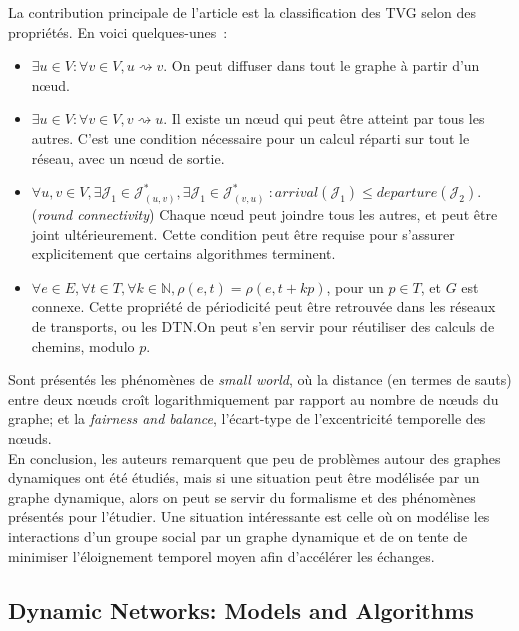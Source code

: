 \documentclass[12pt,a4paper]{article}
\begin{document}
La contribution principale de l'article est la classification des TVG
selon des propriétés. En voici quelques-unes~:

\begin{itemize}
\item \(\exists u \in V : \forall v \in V, u \rightsquigarrow v\). On
  peut diffuser dans tout le graphe à partir d'un nœud.
\item \(\exists u \in V : \forall v \in V, v \rightsquigarrow u\). Il
  existe un nœud qui peut être atteint par tous les autres. C'est une
  condition nécessaire pour un calcul réparti sur tout le réseau, avec
  un nœud de sortie.
\item
  \(\forall u, v \in V, \exists \mathcal{J}_1 \in
  \mathcal{J}^*_{(u,v)}, \exists \mathcal{J}_1 \in
  \mathcal{J}^*_{(v,u)}~: arrival(\mathcal{J}_1) \leq
  departure(\mathcal{J}_2)\). (\textit{round connectivity}) Chaque
  nœud peut joindre tous les autres, et peut être joint
  ultérieurement. Cette condition peut être requise pour s'assurer
  explicitement que certains algorithmes terminent.
\item
  \(\forall e \in E, \forall t \in T, \forall k \in \mathbb{N},
  \rho(e, t) = \rho(e, t + kp)\), pour un \(p \in T\), et \(G\) est
  connexe. Cette propriété de périodicité peut être retrouvée dans les
  réseaux de transports, ou les DTN.\@ On peut s'en servir pour
  réutiliser des calculs de chemins, modulo \(p\).
\end{itemize}

Sont présentés les phénomènes de \textit{small world}, où la distance
(en termes de sauts) entre deux nœuds croît logarithmiquement par
rapport au nombre de nœuds du graphe; et la \textit{fairness and
  balance}, l'écart-type de l'excentricité temporelle des nœuds.\\

En conclusion, les auteurs remarquent que peu de problèmes autour des
graphes dynamiques ont été étudiés, mais si une situation peut être
modélisée par un graphe dynamique, alors on peut se servir du
formalisme et des phénomènes présentés pour l'étudier. Une situation
intéressante est celle où on modélise les interactions d'un groupe
social par un graphe dynamique et de on tente de minimiser
l'éloignement temporel moyen afin d'accélérer les échanges.

\subsection{Dynamic Networks: Models and
  Algorithms~\cite{DBLP:journals/sigact/KuhnO11}}
\end{document}
